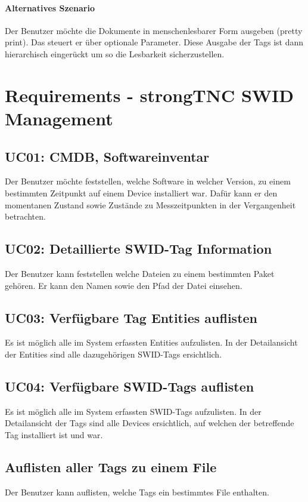 \paragraph{Alternatives Szenario}
Der Benutzer möchte die Dokumente in menschenlesbarer Form ausgeben (pretty
print). Das steuert er über optionale Parameter. Diese Ausgabe der Tags ist dann
hierarchisch eingerückt um so die Lesbarkeit sicherzustellen.


\section{Requirements - strongTNC SWID Management}

\subsection{UC01: CMDB, Softwareinventar}

Der Benutzer möchte feststellen, welche Software in welcher Version, zu einem
bestimmten Zeitpunkt auf einem Device installiert war. Dafür kann er den
momentanen Zustand sowie Zustände zu Messzeitpunkten in der Vergangenheit
betrachten.

\subsection{UC02: Detaillierte SWID-Tag Information}

Der Benutzer kann feststellen welche Dateien zu einem bestimmten Paket gehören.
Er kann den Namen sowie den Pfad der Datei einsehen.

\subsection{UC03: Verfügbare Tag Entities auflisten}

Es ist möglich alle im System erfassten Entities aufzulisten. In der
Detailansicht der Entities sind alle dazugehörigen SWID-Tags ersichtlich.

\subsection{UC04: Verfügbare SWID-Tags auflisten}

Es ist möglich alle im System erfassten SWID-Tags aufzulisten. In der
Detailansicht der Tags sind alle Devices ersichtlich, auf welchen der
betreffende Tag installiert ist und war.

\subsection{Auflisten aller Tags zu einem File}

Der Benutzer kann auflisten, welche Tags ein bestimmtes File enthalten.
